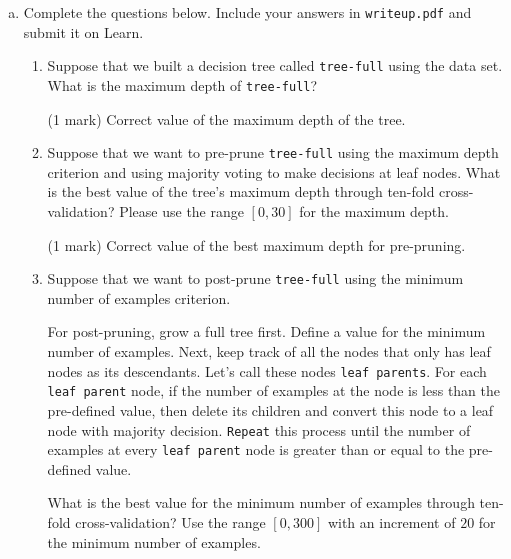 \documentclass[12pt]{article}
\begin{document}
\begin{enumerate}[(a)]
\item 
Complete the questions below. Include your answers in \verb+writeup.pdf+ and submit it on Learn.

\begin{enumerate}[(1)]
\item 
Suppose that we built a decision tree called \verb+tree-full+ using the data set. What is the maximum depth of \verb+tree-full+? 

\begin{markscheme}

(1 mark) Correct value of the maximum depth of the tree.
\end{markscheme}


\item 
Suppose that we want to pre-prune \verb+tree-full+ using the maximum depth criterion and using majority voting to make decisions at leaf nodes. What is the best value of the tree's maximum depth through ten-fold cross-validation? Please use the range $[0, 30]$ for the maximum depth.

\begin{markscheme}

(1 mark) Correct value of the best maximum depth for pre-pruning.
\end{markscheme}


\item 
Suppose that we want to post-prune \verb+tree-full+ using the minimum number of examples criterion.

For post-pruning, grow a full tree first. Define a value for the minimum number of examples. Next, keep track of all the nodes that only has leaf nodes as its descendants. Let's call these nodes \verb+leaf parents+. For each \verb+leaf parent+ node, if the number of examples at the node is less than the pre-defined value, then delete its children and convert this node to a leaf node with majority decision. \verb+Repeat+ this process until the number of examples at every \verb+leaf parent+ node is greater than or equal to the pre-defined value.

What is the best value for the minimum number of examples  through ten-fold cross-validation? Use the range $[0, 300]$ with an increment of $20$ for the minimum number of examples.

\begin{markscheme}


\end{markscheme}
\end{enumerate}
\end{enumerate}
\end{document}

